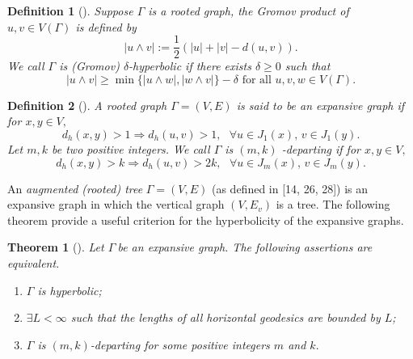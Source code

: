 \documentclass[reqno]{amsart}
\newtheorem{theorem}{Theorem}
\theoremstyle{plain}
\newtheorem{definition}{Definition}
\numberwithin{equation}{section}
\begin{document}
\begin{definition}[\protect\cite{Gromov}]
\label{gromov}Suppose $\Gamma $ is a rooted graph, the \emph{Gromov product}
of $u,v\in V(\Gamma )$ is defined by 
\begin{equation*}
\left\vert u\wedge v\right\vert :=\frac{1}{2}(\left\vert u\right\vert
+\left\vert v\right\vert -d(u,v)).
\end{equation*}%
We call $\Gamma $ is \emph{(Gromov) }$\delta $\emph{-hyperbolic} if there
exists $\delta \geq 0$ such that 
\begin{equation*}
\left\vert u\wedge v\right\vert \geq \min \{\left\vert u\wedge w\right\vert
,\left\vert w\wedge v\right\vert \}-\delta \text{ for all }u,v,w\in V(\Gamma
).
\end{equation*}
\end{definition}

\begin{definition}[\protect\cite{Kong2021}]
A rooted graph $\Gamma =(V,E)$ is said to be an \emph{expansive graph} if
for $x,y\in V,$ 
\begin{equation*}
d_{h}(x,y)>1\Rightarrow d_{h}(u,v)>1,\text{ }\forall u\in J_{1}(x),\,v\in
J_{1}(y).
\end{equation*}%
Let $m,k$ be two positive integers. We call $\Gamma $ is $(m,k)$\emph{%
-departing} if for $x,y\in V,$%
\begin{equation*}
d_{h}(x,y)>k\Rightarrow d_{h}(u,v)>2k,\text{ }\forall u\in J_{m}(x),\,v\in
J_{m}(y).
\end{equation*}
\end{definition}

An \emph{augmented (rooted) tree} $\Gamma =(V,E)$ (as defined in [14, 26,
28]) is an expansive graph in which the vertical graph $(V,E_{v})$ is a
tree. The following theorem provide a useful criterion for the hyperbolicity
of the expansive graphs.

\begin{theorem}[\protect\cite{Kong2021}]
\label{th-Kong}Let $\Gamma \ $be an expansive graph. The following
assertions are equivalent.

\begin{enumerate}
\item[(i)] $\Gamma $ is hyperbolic;

\item[(ii)] $\exists L<\infty $ such that the lengths of all horizontal
geodesics are bounded by $L$;

\item[(iii)] $\Gamma $ is $(m,k)$-departing for some positive integers $m$
and $k.$
\end{enumerate}
\end{theorem}
\end{document}
